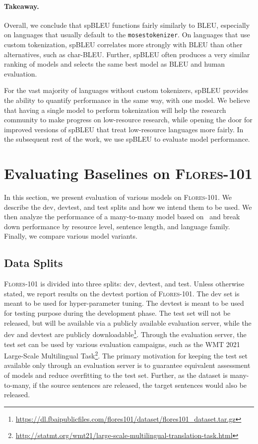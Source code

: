 \paragraph{Takeaway.} 
Overall, we conclude that spBLEU functions fairly similarly to BLEU, especially on languages that usually default to the \texttt{mosestokenizer}. 
On languages that use custom tokenization, spBLEU correlates more strongly with BLEU than other alternatives, such as char-BLEU. Further, spBLEU often produces a very similar ranking of models and selects the same best model as BLEU and human evaluation. 

For the vast majority of languages without custom tokenizers, spBLEU provides the ability to quantify performance in the same way, with one model. We believe that having a single model to perform tokenization will help the research community to make progress on low-resource research, while opening the door for improved versions of spBLEU that treat low-resource languages more fairly. In the subsequent rest of the work, we use spBLEU to evaluate model performance. 

\section{Evaluating Baselines on \textsc{Flores-101}} 
\label{sec:experiments}

In this section, we present evaluation of various models on \textsc{Flores-101}. We describe the dev, devtest, and test splits and how we intend them to be used. We then analyze the performance of a many-to-many model based on~\citet{fan2020beyond} and break down performance by resource level, sentence length, and language family. Finally, we compare various model variants. 

\subsection{Data Splits}

\textsc{Flores-101} is divided into three splits: dev, devtest, and test. Unless otherwise stated, we report results on the devtest portion of \textsc{Flores-101}. 
The dev set is meant to be used for hyper-parameter tuning. The devtest is meant to be used for testing purpose during the development phase. The test set will not be released, but will be available via a publicly available evaluation server, while the dev and devtest are publicly downloadable\footnote{\url{https://dl.fbaipublicfiles.com/flores101/dataset/flores101_dataset.tar.gz}}. 
Through the evaluation server, the test set can be used by various evaluation campaigns, such as the WMT 2021 Large-Scale Multilingual Task\footnote{\url{http://statmt.org/wmt21/large-scale-multilingual-translation-task.html}}.
The primary motivation for keeping the test set available only through an evaluation server is to guarantee equivalent assessment of models and reduce overfitting to the test set. Further, as the dataset is many-to-many, if the source sentences are released, the target sentences would also be released. 

